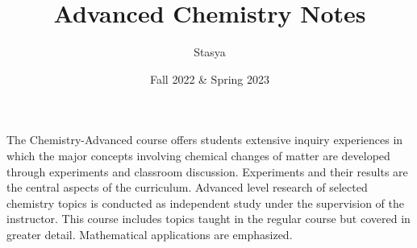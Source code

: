 \documentclass[10pt,a4paper,oneside]{book}
\title{Advanced Chemistry Notes}
\author{Stasya}
\date{Fall 2022 \& Spring 2023}
\begin{document}
\maketitle
\bigbreak
\begin{center}
    The Chemistry-Advanced course offers students extensive inquiry experiences in which the major concepts 
    involving chemical changes of matter are developed through experiments and classroom discussion. Experiments and their 
    results are the central aspects of the curriculum. Advanced level research of selected chemistry topics is conducted as 
    independent study under the supervision of the instructor. This course includes topics taught in the regular course but 
    covered in greater detail. Mathematical applications are emphasized.
\end{center}
\bigbreak
\tableofcontents















\end{document}
